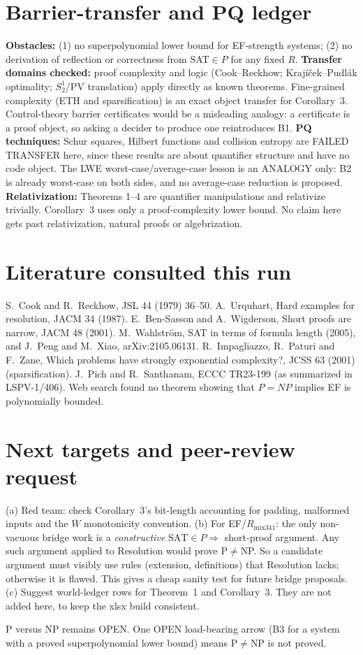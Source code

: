\documentclass[11pt]{article}
\theoremstyle{definition}
\newcommand{\Wb}{\overline W}
\begin{document}
\section{Barrier-transfer and PQ ledger}
\textbf{Obstacles:} (1) no superpolynomial lower bound for EF-strength
systems; (2) no derivation of reflection or correctness from SAT$\in P$ for
any fixed $R$. \textbf{Transfer domains checked:} proof complexity and logic
(Cook--Reckhow; Krajíček--Pudlák optimality; $S^1_2$/PV translation) apply
directly as known theorems. Fine-grained complexity (ETH and sparsification)
is an exact object transfer for Corollary~3. Control-theory barrier
certificates would be a misleading analogy: a certificate is a proof object,
so asking a decider to produce one reintroduces B1. \textbf{PQ techniques:}
Schur squares, Hilbert functions and collision entropy are FAILED TRANSFER
here, since these results are about quantifier structure and have no code
object. The LWE worst-case/average-case lesson is an ANALOGY only: B2 is
already worst-case on both sides, and no average-case reduction is proposed.
\textbf{Relativization:} Theorems 1--4 are quantifier manipulations and
relativize trivially. Corollary~3 uses only a proof-complexity lower bound.
No claim here gets past relativization, natural proofs or algebrization.

\section{Literature consulted this run}
S.~Cook and R.~Reckhow, JSL 44 (1979) 36--50.
A.~Urquhart, Hard examples for resolution, JACM 34 (1987).
E.~Ben-Sasson and A.~Wigderson, Short proofs are narrow, JACM 48 (2001).
M.~Wahlstr\"om, SAT in terms of formula length (2005), and J.~Peng and
M.~Xiao, arXiv:2105.06131.
R.~Impagliazzo, R.~Paturi and F.~Zane, Which problems have strongly
exponential complexity?, JCSS 63 (2001) (sparsification).
J.~Pich and R.~Santhanam, ECCC TR23-199 (as summarized in LSPV-1/406).
Web search found no theorem showing that $P=NP$ implies EF is polynomially
bounded.

\section{Next targets and peer-review request}
(a) Red team: check Corollary~3's bit-length accounting for padding, malformed
inputs and the $\Wb$ monotonicity convention. (b) For EF/$R_{\mathrm{mix341}}$:
the only non-vacuous bridge work is a \emph{constructive}
$\mathrm{SAT}\in P\Rightarrow$ short-proof argument. Any such argument applied
to Resolution would prove P$\ne$NP. So a candidate argument must visibly
use rules (extension, definitions) that Resolution lacks; otherwise it is
flawed. This gives a cheap sanity test for future bridge proposals.
(c) Suggest world-ledger rows for Theorem~1 and Corollary~3. They are not
added here, to keep the xlsx build consistent.

\medskip\noindent P versus NP remains OPEN. One OPEN load-bearing arrow (B3
for a system with a proved superpolynomial lower bound) means P$\ne$NP is
not proved.
\end{document}
